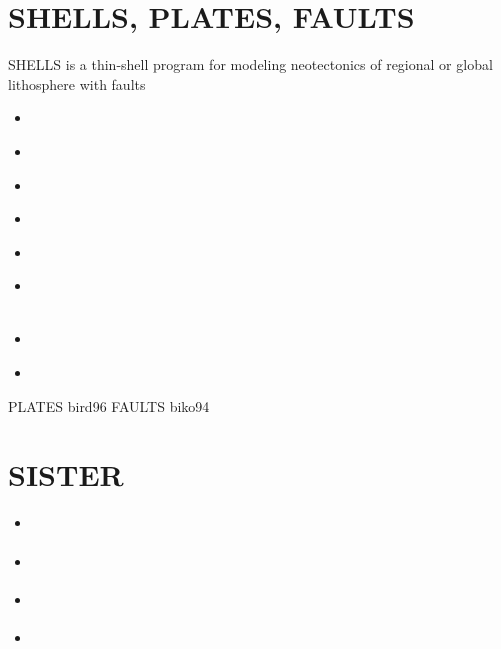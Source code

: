 \section{SHELLS, PLATES, FAULTS} 

SHELLS is a thin-shell program for modeling neotectonics of
regional or global lithosphere with faults

\begin{small}
\begin{itemize}
\item[1989]
\textcite{bird89}
\item[1994]
\textcite{kobi94} \\
\textcite{biko94}
\item[1995]
\textcite{kobi95}
\item[1999]
\textcite{bili99}
\item[2001]
\textcite{jibf01}\\
\textcite{jift01}
\item[2002]
\textcite{nebs02}\\
\textcite{libi02b}\\
\textcite{libi02}
\item[2003]
\textcite{jine03}
\item[2004]
\textcite{nejv04}
\end{itemize}
\end{small}

PLATES bird96
FAULTS biko94



\section{SISTER}

\begin{small}
\begin{itemize}
\item[\twothousandsixteen]    \textcite{olbm16} 
\item[\twothousandeighteen]   \textcite{weib18}
\item[\twothousandtwentyone]  \textcite{haao21}
\item[\twothousandtwentyfive] \textcite{kict25}
\end{itemize}
\end{small}


